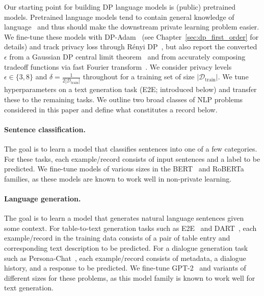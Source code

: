 Our starting point for building DP language models is (public) pretrained models. 
Pretrained language models tend to contain general knowledge of language~\citep{manning2020emergent} and thus should make the downstream private learning problem easier.
We fine-tune these models with DP-Adam~\citep{abadi2016deep,kingma2014adam} (see Chapter~\ref{sec:dp_first_order} for details) and track privacy loss through R\'enyi DP~\citep{mironov2017renyi}, but also report the converted $\epsilon$ from a Gaussian DP central limit theorem~\citep{dong2019gaussian} and from accurately composing tradeoff functions via fast Fourier transform~\citep{gopi2021numerical}.
We consider privacy levels $\epsilon \in \{3,8\}$ and $\delta = \tfrac{1}{2 |\mathcal{D}_\text{train}|}$ throughout
for a training set of size $|\mathcal{D}_\text{train}|$.
We tune hyperparameters on a text generation task (E2E; introduced below) and transfer these to the remaining tasks.
We outline two broad classes of NLP problems considered in this paper and define what constitutes a record below.

\paragraph{Sentence classification.}
The goal is to learn a model that classifies sentences into one of a few categories.
For these tasks, each example/record consists of input sentences and a label to be predicted.
We fine-tune models of various sizes in the BERT~\citep{devlin2018bert} and RoBERTa~\citep{liu2019roberta} families, as these models are known to work well in non-private learning.

\paragraph{Language generation.}
The goal is to learn a model that generates natural language sentences given some context.
For table-to-text generation tasks such as E2E~\citep{novikova2017e2e} and DART~\citep{nan2020dart}, each example/record in the training data consists of a pair of table entry and corresponding text description to be predicted. 
For a dialogue generation task such as Persona-Chat~\citep{zhang2018personalizing}, each example/record consists of metadata, a dialogue history, and a response to be predicted. 
We fine-tune GPT-2~\citep{radford2019language} and variants of different sizes for these problems, as this model family is known to work well for text generation. 
